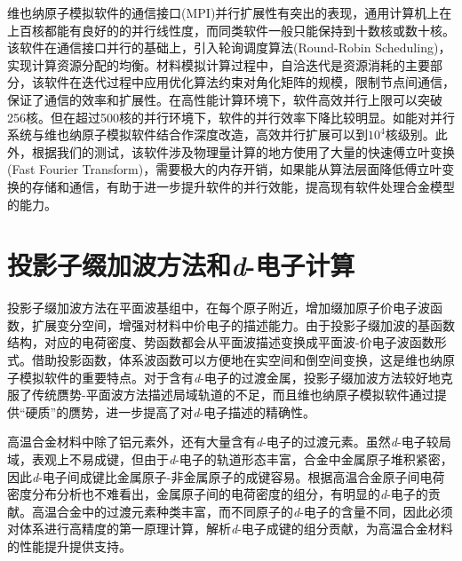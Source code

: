 维也纳原子模拟软件的通信接口(\textrm{MPI})并行扩展性有突出的表现，通用计算机上在上百核都能有良好的的并行线性度，而同类软件一般只能保持到十数核或数十核。该软件在通信接口并行的基础上，引入轮询调度算法\textrm{(Round-Robin Scheduling)}，实现计算资源分配的均衡。材料模拟计算过程中，自洽迭代是资源消耗的主要部分，该软件在迭代过程中应用优化算法约束对角化矩阵的规模，限制节点间通信，保证了通信的效率和扩展性。在高性能计算环境下，软件高效并行上限可以突破256核。但在超过500核的并行环境下，软件的并行效率下降比较明显。如能对并行系统与维也纳原子模拟软件结合作深度改造，高效并行扩展可以到$10^4$核级别。此外，根据我们的测试，该软件涉及物理量计算的地方使用了大量的快速傅立叶变换(\textrm{Fast Fourier Transform})，需要极大的内存开销，如果能从算法层面降低傅立叶变换的存储和通信，有助于进一步提升软件的并行效能，提高现有软件处理合金模型的能力。

\section{投影子缀加波方法和\textit{d}-电子计算}
投影子缀加波方法在平面波基组中，在每个原子附近，增加缀加原子价电子波函数，扩展变分空间，增强对材料中价电子的描述能力。由于投影子缀加波的基函数结构，对应的电荷密度、势函数都会从平面波描述变换成平面波-价电子波函数形式。借助投影函数，体系波函数可以方便地在实空间和倒空间变换，这是维也纳原子模拟软件的重要特点。对于含有\textit{d}-电子的过渡金属，投影子缀加波方法较好地克服了传统赝势-平面波方法描述局域轨道的不足，而且维也纳原子模拟软件通过提供“硬质”的赝势，进一步提高了对\textit{d}-电子描述的精确性。

高温合金材料中除了铝元素外，还有大量含有\textit{d}-电子的过渡元素。虽然\textit{d}-电子较局域，表观上不易成键，但由于\textit{d}-电子的轨道形态丰富，合金中金属原子堆积紧密，因此\textit{d}-电子间成键比金属原子-非金属原子的成键容易。根据高温合金原子间电荷密度分布分析也不难看出，金属原子间的电荷密度的组分，有明显的\textit{d}-电子的贡献。高温合金中的过渡元素种类丰富，而不同原子的\textit{d}-电子的含量不同，因此必须对体系进行高精度的第一原理计算，解析\textit{d}-电子成键的组分贡献，为高温合金材料的性能提升提供支持。%

